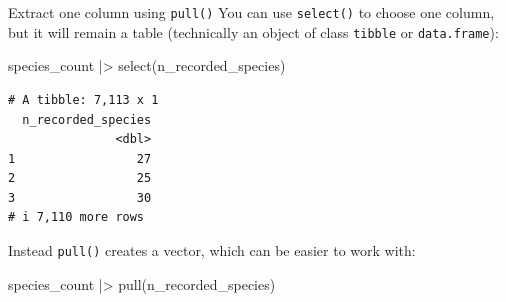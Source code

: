 \documentclass[
  ignorenonframetext,
  aspectratio=169,
]{beamer}
\newenvironment{Shaded}{\begin{snugshade}}{\end{snugshade}}
\newcommand{\FunctionTok}[1]{\textcolor[rgb]{0.28,0.35,0.67}{#1}}
\newcommand{\NormalTok}[1]{\textcolor[rgb]{0.00,0.23,0.31}{#1}}
\newcommand{\SpecialCharTok}[1]{\textcolor[rgb]{0.37,0.37,0.37}{#1}}
\let\oldtexttt\texttt
\renewcommand{\texttt}[1]{\colorbox{gray!20}{\oldtexttt{#1}}}
\begin{document}
\begin{frame}[fragile]{Extract one column using \texttt{pull()}}
\protect{}\label{extract-one-column-using-pull}
You can use \texttt{select()} to choose one column, but it will remain a
table (technically an object of class \texttt{tibble} or
\texttt{data.frame}):

\footnotesize

\begin{Shaded}
\begin{Highlighting}[]
\NormalTok{species\_count }\SpecialCharTok{|\textgreater{}} \FunctionTok{select}\NormalTok{(n\_recorded\_species)}
\end{Highlighting}
\end{Shaded}

\begin{verbatim}
# A tibble: 7,113 x 1
  n_recorded_species
               <dbl>
1                 27
2                 25
3                 30
# i 7,110 more rows
\end{verbatim}

\normalsize

\pause

Instead \texttt{pull()} creates a vector, which can be easier to work
with:

\footnotesize

\begin{Shaded}
\begin{Highlighting}[]
\NormalTok{species\_count }\SpecialCharTok{|\textgreater{}} \FunctionTok{pull}\NormalTok{(n\_recorded\_species)}
\end{Highlighting}
\end{Shaded}


\end{frame}
\end{document}
